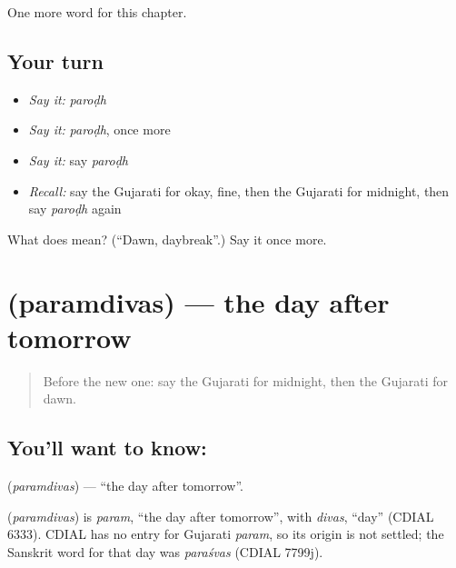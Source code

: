 \begin{grammarlens}[title={What you've built}]
One more word for this chapter.
\end{grammarlens}

\subsection*{Your turn}
\begin{itemize}
\raggedright
  \item \emph{Say it:} \emph{paroḍh}
  \item \emph{Say it:} \emph{paroḍh}, once more
  \item \emph{Say it:} say \emph{paroḍh}
  \item \emph{Recall:} say the Gujarati for okay, fine, then the Gujarati for midnight, then say \emph{paroḍh} again
\end{itemize}

\begin{tcolorbox}[breakable,colback=teal!4,colframe=teal!35!black,title={Before you move on}]
What does  mean? (\textquotedblleft{}Dawn, daybreak\textquotedblright{}.) Say it once more.
\end{tcolorbox}
\section[\texorpdfstring{\gu{પરમદિવસ} (paramdivas)}{પરમદિવસ (paramdivas)}]{ (paramdivas) — the day after tomorrow}

\label{lesson:GU-C92-paramdivas}



\begin{quote}
Before the new one: say the Gujarati for midnight, then the Gujarati for dawn.
\end{quote}

\subsection*{You'll want to know: }
\textbf{} (\emph{paramdivas}) — \textquotedblleft{}the day after tomorrow\textquotedblright{}.

\begin{cousinweb}
\textbf{} (\emph{paramdivas}) is \emph{param}, \textquotedblleft{}the day after tomorrow\textquotedblright{}, with \emph{divas}, \textquotedblleft{}day\textquotedblright{} (CDIAL 6333). CDIAL has no entry for Gujarati \emph{param}, so its origin is not settled; the Sanskrit word for that day was \emph{paraśvas} (CDIAL 7799j).
\end{cousinweb}

